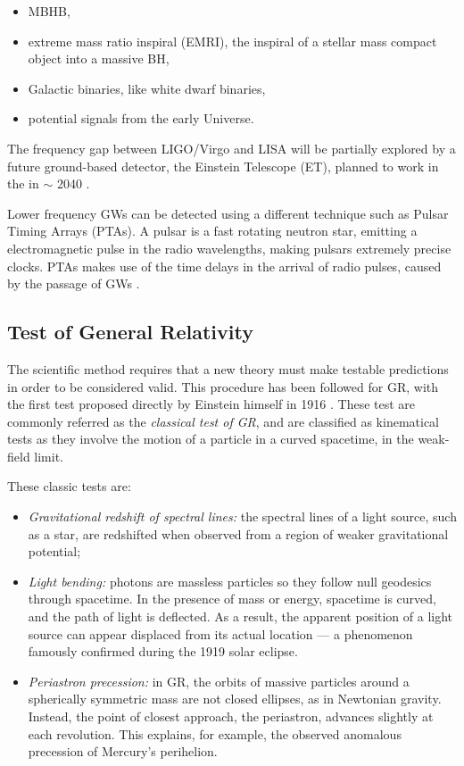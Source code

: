\begin{itemize} 
\item MBHB,
\item extreme mass ratio inspiral (EMRI), the inspiral of a stellar mass compact object into a massive BH,
\item Galactic binaries, like white dwarf binaries,
\item potential signals from the early Universe.
\end{itemize}


The frequency gap between LIGO/Virgo and LISA will be partially explored by a future ground-based detector, the Einstein Telescope (ET), planned to work in the in $\sim$ 2040 \cite{abac2025scienceeinsteintelescope}.

Lower frequency GWs can be detected using a different technique such as Pulsar Timing Arrays (PTAs). A pulsar is a fast rotating neutron star, emitting a electromagnetic pulse in the radio wavelengths, making pulsars extremely precise clocks. PTAs makes use of the time delays in the arrival of radio pulses, caused by the passage of GWs \cite{Maiorano_2021}.




\subsection{Test of General Relativity}
\label{Test_of_GR}

The scientific method requires that a new theory must make testable predictions in order to be considered valid. This procedure has been followed for GR, with the first test proposed directly by Einstein himself in 1916 \cite{1916AnP...354..769E}. These test are commonly referred as the \textit{classical test of GR}, and are classified as kinematical tests as they involve the motion of a particle in a curved spacetime, in the weak-field limit. 

These classic tests are: 

\begin{itemize} 
\item \textit{Gravitational redshift of spectral lines:} the spectral lines of a light source, such as a star, are redshifted when observed from a region of weaker gravitational potential;

\item \textit{Light bending:} photons are massless particles so they follow null geodesics through spacetime. In the presence of mass or energy, spacetime is curved, and the path of light is deflected. As a result, the apparent position of a light source can appear displaced from its actual location — a phenomenon famously confirmed during the 1919 solar eclipse.

\item \textit{Periastron precession:} in GR, the orbits of massive particles around a spherically symmetric mass are not closed ellipses, as in Newtonian gravity. Instead, the point of closest approach, the periastron, advances slightly at each revolution. This explains, for example, the observed anomalous precession of Mercury’s perihelion. 
\end{itemize}

